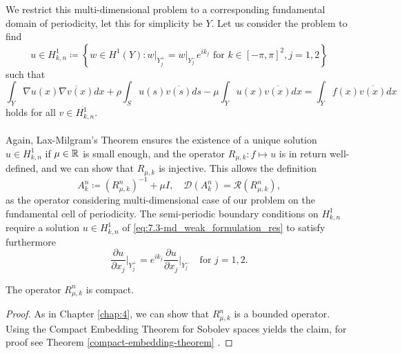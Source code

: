 We restrict this multi-dimensional problem to a corresponding fundamental domain of periodicity, let this for simplicity be $Y$. Let us consider the problem to find 
	\[ u \in H^{1}_{k, n} \coloneqq \left\{ w \in H^{1}(Y) \colon w \big|_{Y_{j}^{+}} = w \big|_{Y_{j}^{-}} e^{i k_{j}} \text{ for } k \in [-\pi, \pi]^{2}, j = 1,2 \right\} \] %
such that
	\begin{equation}
		\int_{Y} \nabla u(x) \overline{\nabla v(x)} dx + \rho \int_{S} u(s) \overline{v(s)} ds - \mu \int_{Y} u(x) \overline{v(x)} dx = \int_{Y} f(x) \overline{v(x)} dx \label{eq:7.3-md_weak_formulation_res}
	\end{equation} 
holds for all $v \in H^{1}_{k, n}$. 
~\\ ~\\
Again, Lax-Milgram's Theorem ensures the existence of a unique solution $u \in H^{1}_{k, n}$ if $\mu \in \mathbb{R}$ is small enough, and the operator $R_{\mu, k} \colon f \mapsto u$ is in return well-defined, and we can show that $R_{\mu, k}$ is injective. This allows the definition 
	\[ A_{k}^{n} \coloneqq \left(R_{\mu, k}^{n}\right)^{-1} + \mu I, \quad \mathcal{D}(A_{k}^{n}) = \mathcal{R}(R_{\mu, k}^{n}), \]
as the operator considering multi-dimensional case of our problem on the fundamental cell of periodicity. The semi-periodic boundary conditions on $H^{1}_{k,n}$ require a solution $u \in H^{1}_{k, n}$ of \eqref{eq:7.3-md_weak_formulation_res} to satisfy furthermore
	\[ \frac{\partial u}{\partial x_{j}}\big|_{Y_{j}^{+}} = e^{ik_{j}} \frac{\partial u}{\partial x_{j}}\big|_{Y_{j}^{-}} \quad \text{for } j = 1, 2.  \]
\begin{theorem}
	The operator $R_{\mu, k}^{n}$ is compact.	

	\begin{proof}
		As in Chapter \ref{chap:4}, we can show that $R_{\mu, k}^{n}$ is a bounded operator. Using the Compact Embedding Theorem for Sobolev spaces yields the claim, for proof see Theorem \ref{compact-embedding-theorem} .
	\end{proof}
\end{theorem}



